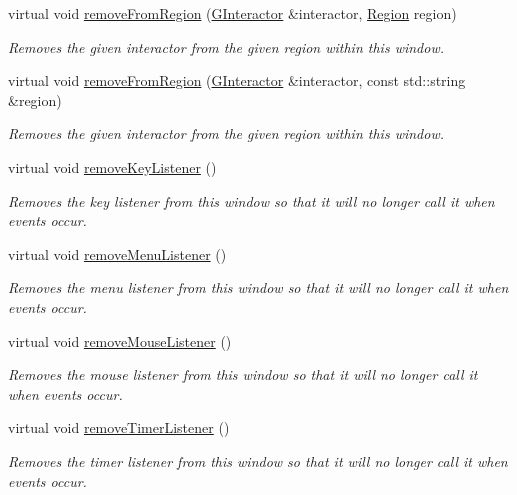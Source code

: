 \begin{DoxyCompactItemize}
virtual void \mbox{\hyperlink{classGWindow_afee7b65f917c4f6a0fdb1c8ea75406a5}{remove\+From\+Region}} (\mbox{\hyperlink{classGInteractor}{G\+Interactor}} \&interactor, \mbox{\hyperlink{classGWindow_a81a01a86de31071a92e6cce0bab9bc4b}{Region}} region)
\begin{DoxyCompactList}\small\item\em Removes the given interactor from the given region within this window. \end{DoxyCompactList}\item 
virtual void \mbox{\hyperlink{classGWindow_af7a055c83c0e0e3f3722596d7111fcbe}{remove\+From\+Region}} (\mbox{\hyperlink{classGInteractor}{G\+Interactor}} \&interactor, const std\+::string \&region)
\begin{DoxyCompactList}\small\item\em Removes the given interactor from the given region within this window. \end{DoxyCompactList}\item 
virtual void \mbox{\hyperlink{classGWindow_a43095f41cab3be732b49f29970484b05}{remove\+Key\+Listener}} ()
\begin{DoxyCompactList}\small\item\em Removes the key listener from this window so that it will no longer call it when events occur. \end{DoxyCompactList}\item 
virtual void \mbox{\hyperlink{classGWindow_a718d186fa807d6dec721c3b6f0c4309a}{remove\+Menu\+Listener}} ()
\begin{DoxyCompactList}\small\item\em Removes the menu listener from this window so that it will no longer call it when events occur. \end{DoxyCompactList}\item 
virtual void \mbox{\hyperlink{classGWindow_aff47f71ce47e688a07c9d38dc92fcc11}{remove\+Mouse\+Listener}} ()
\begin{DoxyCompactList}\small\item\em Removes the mouse listener from this window so that it will no longer call it when events occur. \end{DoxyCompactList}\item 
virtual void \mbox{\hyperlink{classGWindow_a8ca9bf0f8dfd3755d73d07ee01e3455f}{remove\+Timer\+Listener}} ()
\begin{DoxyCompactList}\small\item\em Removes the timer listener from this window so that it will no longer call it when events occur. \end{DoxyCompactList}\item 

\end{DoxyCompactItemize}

